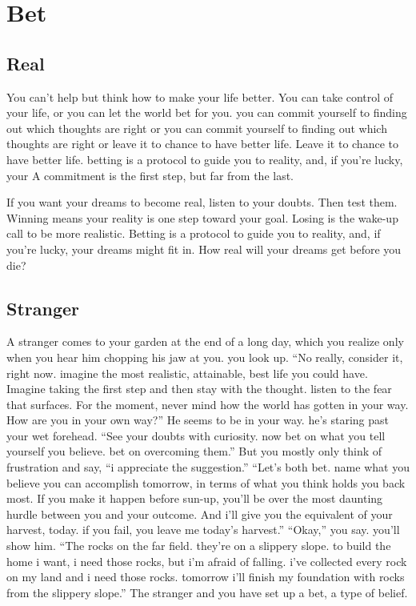 \documentclass[
]{book}
\begin{document}
\hypertarget{bet}{%
\chapter{Bet}\label{bet}}

\hypertarget{real}{%
\section{Real}\label{real}}

You can't help but think how to make your life better.
You can take control of your life, or you can let the world bet for you. you can commit yourself to finding out which thoughts are right or you can commit yourself to finding out which thoughts are right or leave it to chance to have better life.
Leave it to chance to have better life. betting is a protocol to guide you to reality, and, if you're lucky, your
A commitment is the first step, but far from the last.

If you want your dreams to become real, listen to your doubts.
Then test them.
Winning means your reality is one step toward your goal.
Losing is the wake-up call to be more realistic.
Betting is a protocol to guide you to reality, and, if you're lucky, your dreams might fit in.
How real will your dreams get before you die?

\hypertarget{stranger}{%
\section{Stranger}\label{stranger}}

A stranger comes to your garden at the end of a long day, which you realize only when you hear him chopping his jaw at you. you look up.
``No really, consider it, right now. imagine the most realistic, attainable, best life you could have.
Imagine taking the first step and then stay with the thought. listen to the fear that surfaces.
For the moment, never mind how the world has gotten in your way.
How are you in your own way?''
He seems to be in your way. he's staring past your wet forehead.
``See your doubts with curiosity. now bet on what you tell yourself you believe. bet on overcoming them.''
But you mostly only think of frustration and say, ``i appreciate the suggestion.''
``Let's both bet. name what you believe you can accomplish tomorrow, in terms of what you think holds you back most.
If you make it happen before sun-up, you'll be over the most daunting hurdle between you and your outcome.
And i'll give you the equivalent of your harvest, today. if you fail, you leave me today's harvest.''
``Okay,'' you say. you'll show him.
``The rocks on the far field. they're on a slippery slope. to build the home i want, i need those rocks, but i'm afraid of falling. i've collected every rock on my land and i need those rocks. tomorrow i'll finish my foundation with rocks from the slippery slope.''
The stranger and you have set up a bet, a type of belief.
\end{document}
